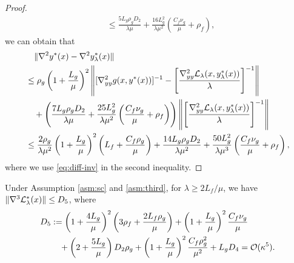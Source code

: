 \begin{proof}
{\begin{align*}
    &\le  \frac{5L_g \rho_g D_2}{\lambda \mu} + \frac{16L_g^2 }{\lambda \mu^2} \left( \frac{C_f \nu_g}{\mu} + \rho_f \right),
\end{align*}}
we can obtain that
{\small 
\begin{align*}
    &\quad \Vert \nabla^2 y^*(x) - \nabla^2 y_{\lambda}^*(x) \Vert  \\
    &\le \rho_g \left( 1 + \frac{L_g}{\mu}\right)^2 \left \Vert [\nabla_{yy}^2 g(x,y^*(x))]^{-1} - \left [  \frac{\nabla_{yy}^2 {\mathcal{L}}_{\lambda}(x,y_{\lambda}^*(x))}{\lambda} \right]^{-1}  \right \Vert \\
    &\quad + \left( \frac{7L_g \rho_g D_2}{\lambda \mu} + \frac{25L_g^2 }{\lambda \mu^2} \left( \frac{C_f \nu_g}{\mu} + \rho_f \right) \right) \left \Vert \left [  \frac{\nabla_{yy}^2 {\mathcal{L}}_{\lambda}(x,y_{\lambda}^*(x))}{\lambda} \right]^{-1} \right \Vert \\
    &\le \frac{2\rho_g}{\lambda \mu^2}  \left( 1 + \frac{L_g}{\mu}\right)^2  \left(L_f + 
     \frac{C_f \rho_g}{\mu}
     \right) +   \frac{14 L_g \rho_g D_2}{\lambda \mu^2} + \frac{50 L_g^2 }{\lambda \mu^3} \left( \frac{C_f \nu_g}{\mu} + \rho_f \right) ,
\end{align*}}
where we use \eqref{eq:diff-inv} in the second inequality.
\end{proof}

\begin{lem} \label{lem:nabla3-bound}
Under Assumption \ref{asm:sc} and \ref{asm:third}, for $ \lambda \ge 2 L_f /\mu$, we have $\Vert \nabla^3 {\mathcal{L}}_{\lambda}^*(x) \Vert \le  D_5 $, where
\begin{align*}
    D_5 &:=  \left( 1 + \frac{4L_g}{\mu} \right)^2 \left( 3\rho_f  + \frac{2 L_f \rho_g}{\mu} \right) + \left(1 + \frac{L_g}{\mu} \right)^2 \frac{C_f \nu_g}{\mu} \\
    &\quad + \left(2+ \frac{5L_g}{\mu} \right) D_2 \rho_g +  \left( 1+ \frac{L_g}{\mu} \right)^2 \frac{C_f \rho_g^2}{\mu^2} + L_g D_4   = {\mathcal{O}}(\kappa^5).
\end{align*}
\end{lem}

